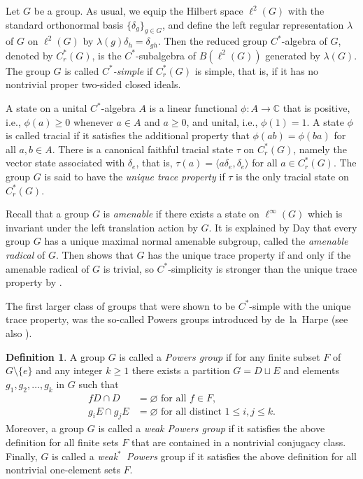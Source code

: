 \documentclass[a4paper]{amsart}
\theoremstyle{plain}
\theoremstyle{definition}
\newtheorem{definition}[theorem]{Definition}
\theoremstyle{remark}
\newcommand{\C}{\mathbb{C}}
\numberwithin{theorem}{section}
\begin{document}
Let $G$ be a group.
As usual, we equip the Hilbert space $\ell^2(G)$ with the standard orthonormal basis $\{\delta_g\}_{g\in G}$,
and define the left regular representation $\lambda$ of $G$ on $\ell^2(G)$ by $\lambda(g)\delta_h=\delta_{gh}$.
Then the reduced group $C^*$-algebra of $G$, denoted by $C^*_r(G)$, is the $C^*$-subalgebra of $B(\ell^2(G))$ generated by $\lambda(G)$.
The group $G$ is called \emph{$C^*$-simple} if $C^*_r(G)$ is simple, that is, if it has no nontrivial proper two-sided closed ideals.

A state on a unital $C^*$-algebra $A$ is a linear functional $\phi\colon A\to\C$ that is positive,
i.e., $\phi(a)\geq 0$ whenever $a\in A$ and $a\geq 0$, and unital, i.e., $\phi(1)=1$.
A state $\phi$ is called tracial if it satisfies the additional property that $\phi(ab)=\phi(ba)$ for all $a,b\in A$.
There is a canonical faithful tracial state $\tau$ on $C^*_r(G)$,
namely the vector state associated with $\delta_e$,
that is, $\tau(a)=\langle a\delta_e,\delta_e\rangle$ for all $a\in C^*_r(G)$.
The group $G$ is said to have the \emph{unique trace property} if $\tau$ is the only tracial state on $C^*_r(G)$.

Recall that a group $G$ is \emph{amenable} if there exists a state on $\ell^\infty(G)$
which is invariant under the left translation action by $G$.
It is explained by Day \cite{Day} that every group $G$ has a unique maximal normal amenable subgroup,
called the \emph{amenable radical} of $G$.
Then \cite[Theorem~1.3]{BKKO} shows that $G$ has the unique trace property if and only if the amenable radical of $G$ is trivial,
so $C^*$-simplicity is stronger than the unique trace property by \cite[Proposition~3]{Harpe2}.

The first larger class of groups that were shown to be $C^*$-simple with the unique trace property,
was the so-called Powers groups introduced by de~la~Harpe \cite{Harpe} (see also \cite{Harpe-Jhabvala}).

\begin{definition}
A group $G$ is called a \emph{Powers group} if for any finite subset $F$ of $G\setminus\{e\}$ and any integer $k\geq 1$
there exists a partition $G=D\sqcup E$ and elements $g_1,g_2,\dotsc,g_k$ in $G$ such that
\[
\begin{split}
fD \cap D &= \varnothing \text{ for all } f\in F,\\
g_iE \cap g_jE &= \varnothing \text{ for all distinct } 1\leq i,j \leq k.
\end{split}
\]
Moreover, a group $G$ is called a \emph{weak Powers group}
if it satisfies the above definition for all finite sets $F$ that are contained in a nontrivial conjugacy class.
Finally, $G$ is called a \emph{weak$^*$~Powers} group if it satisfies the above definition for all nontrivial one-element sets $F$.
\end{definition}
\end{document}
